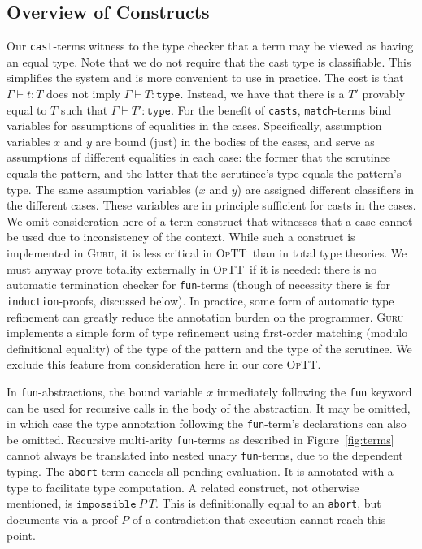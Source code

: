 \documentclass{fundam}
\newcommand{\optt}{\textsc{OpTT}}
\begin{document}
\subsection{Overview of Constructs}

Our \texttt{cast}-terms witness to the type checker that a term may be
viewed as having an equal type.  Note that we do not require that the
cast type is classifiable.  This simplifies the system and is more
convenient to use in practice.  The cost is that $\Gamma\vdash t:T$
does not imply $\Gamma \vdash T:\texttt{type}$.  Instead, we have that
there is a $T'$ provably equal to $T$ such that $\Gamma\vdash T' :
\texttt{type}$.  For the benefit of \texttt{casts},
\texttt{match}-terms bind variables for assumptions of equalities in
the cases.  Specifically, assumption variables $x$ and $y$ are bound
(just) in the bodies of the cases, and serve as assumptions of
different equalities in each case: the former that the scrutinee
equals the pattern, and the latter that the scrutinee's type equals
the pattern's type.  The same assumption variables ($x$ and $y$) are
assigned different classifiers in the different cases.  These
variables are in principle sufficient for casts in the cases.  We omit
consideration here of a term construct that witnesses that a case
cannot be used due to inconsistency of the context.  While such a
construct is implemented in \textsc{Guru}, it is less critical in
\optt\ than in total type theories.  We must anyway prove totality
externally in \optt\ if it is needed: there is no automatic
termination checker for \texttt{fun}-terms (though of necessity there
is for \texttt{induction}-proofs, discussed below).  In practice, some
form of automatic type refinement can greatly reduce the annotation
burden on the programmer.  \textsc{Guru} implements a simple form of
type refinement using first-order matching (modulo definitional
equality) of the type of the pattern and the type of the scrutinee.
We exclude this feature from consideration here in our core \optt.

In \texttt{fun}-abstractions, the bound variable $x$ immediately
following the \texttt{fun} keyword can be used for recursive calls in
the body of the abstraction.  It may be omitted, in which case the
type annotation following the \texttt{fun}-term's declarations can
also be omitted.  Recursive multi-arity \texttt{fun}-terms as
described in Figure~\ref{fig:terms} cannot always be translated into
nested unary \texttt{fun}-terms, due to the dependent typing.  The
\texttt{abort} term cancels all pending evaluation.  It is annotated
with a type to facilitate type computation.  A related construct, not
otherwise mentioned, is $\texttt{impossible}\ P\ T$.  This is
definitionally equal to an \texttt{abort}, but documents via a proof
$P$ of a contradiction that execution cannot reach this point.
\end{document}
